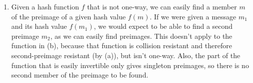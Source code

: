 \begin{enumerate}
\item Given a hash function $f$ that is not one-way, we can easily find a member
$m$ of the preimage of a given hash value $f(m)$. If we were given a message
$m_1$ and its hash value $f(m_1)$, we would expect to be able to find a second
preimage $m_2$, as we can easily find preimages. This doesn't apply to the
function in (b), because that function is collision resistant and therefore
second-preimage resistant (by (a)), but isn't one-way. Also, the part of the
function that is easily invertible only gives singleton preimages, so there is
no second member of the preimage to be found.

\end{enumerate}
